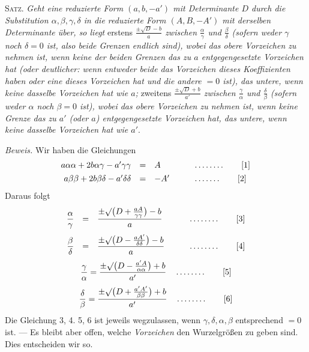 
\textsc{Satz.} \textit{Geht eine reduzierte Form $(a,b,-a')$ mit Determinante $D$ durch die Substitution $\alpha,\beta,\gamma,\delta$ in die reduzierte Form $(A,B,-A')$ mit derselben Determinante über, so liegt} erstens \textit{$\frac{\pm\surd D-b}{a}$ zwischen $\frac{\alpha}{\gamma}$ und $\frac{\beta}{\delta}$ (sofern weder $\gamma$ noch $\delta=0$ ist, also beide Grenzen endlich sind), wobei das obere Vorzeichen zu nehmen ist, wenn keine der beiden Grenzen das zu $a$ entgegengesetzte Vorzeichen hat (oder deutlicher: wenn entweder beide das Vorzeichen dieses Koeffizienten haben oder eine dieses Vorzeichen hat und die andere $=0$ ist), das untere, wenn keine dasselbe Vorzeichen hat wie $a$;} zweitens \textit{$\frac{\pm\surd D+b}{a'}$ zwischen $\frac{\gamma}{\alpha}$ und $\frac{\delta}{\beta}$ (sofern weder $\alpha$ noch $\beta=0$ ist), wobei das obere Vorzeichen zu nehmen ist, wenn keine Grenze das zu $a'$ (oder $a$) entgegengesetzte Vorzeichen hat, das untere, wenn keine dasselbe Vorzeichen hat wie $a'$}.

\textit{Beweis.} Wir haben die Gleichungen
\[
\begin{array}{rcll}
a\alpha\alpha+2b\alpha\gamma-a'\gamma\gamma&=&A&\qquad\mathinner{\ldotp\ldotp\ldotp\ldotp\ldotp\ldotp\ldotp\ldotp}\qquad[1]\\[4pt]
a\beta\beta+2b\beta\delta-a'\delta\delta&=&-A'&\qquad\mathinner{\ldotp\ldotp\ldotp\ldotp\ldotp\ldotp\ldotp}\qquad[2]
\end{array}
\]
Daraus folgt
\[
\begin{array}{rcll}
\dfrac{\alpha}{\gamma}&=&\dfrac{\pm\surd\bigl(D+\frac{aA}{\gamma\gamma}\bigr)-b}{{a}}&\qquad\mathinner{\ldotp\ldotp\ldotp\ldotp\ldotp\ldotp\ldotp\ldotp}\qquad[3]\\[12pt]
\dfrac{\beta}{\delta}&=&\dfrac{\pm\surd\bigl(D-\frac{aA'}{\delta\delta}\bigr)-b}{a}&\qquad\mathinner{\ldotp\ldotp\ldotp\ldotp\ldotp\ldotp\ldotp\ldotp}\qquad[4]
\end{array}
\]
\begin{equation*}
\frac{\gamma}{\alpha}=\frac{\pm\surd\bigl(D-\frac{a'A}{\alpha\alpha}\bigr)+b}{a'}
\quad \mathinner{\ldotp\ldotp\ldotp\ldotp\ldotp\ldotp\ldotp\ldotp} \tag*{[5]}
\end{equation*}
\begin{equation*}
\frac{\delta}{\beta}=\frac{\pm\surd\bigl(D+\frac{a'A'}{\beta\beta}\bigr)+b}{a'}
\quad \mathinner{\ldotp\ldotp\ldotp\ldotp\ldotp\ldotp\ldotp\ldotp} \tag*{[6]}
\end{equation*}
Die Gleichung 3, 4. 5, 6 ist jeweils wegzulassen, wenn $\gamma,\delta,\alpha,\beta$ entsprechend $=0$ ist. --- Es bleibt aber offen, welche \textit{Vorzeichen} den Wurzelgrößen zu geben sind. Dies entscheiden wir so.

